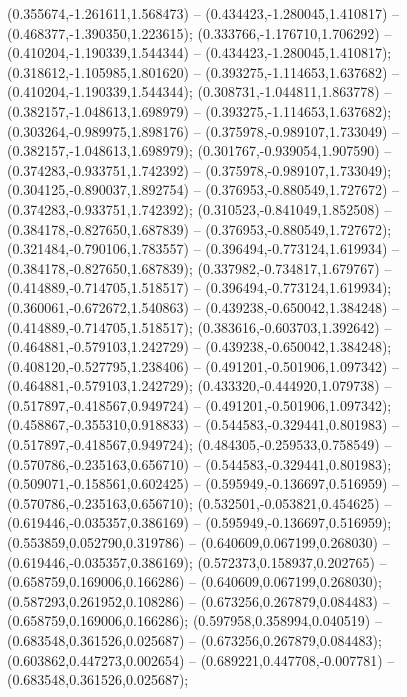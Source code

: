  (0.355674,-1.261611,1.568473) -- (0.434423,-1.280045,1.410817) -- (0.468377,-1.390350,1.223615);
 (0.333766,-1.176710,1.706292) -- (0.410204,-1.190339,1.544344) -- (0.434423,-1.280045,1.410817);
 (0.318612,-1.105985,1.801620) -- (0.393275,-1.114653,1.637682) -- (0.410204,-1.190339,1.544344);
 (0.308731,-1.044811,1.863778) -- (0.382157,-1.048613,1.698979) -- (0.393275,-1.114653,1.637682);
 (0.303264,-0.989975,1.898176) -- (0.375978,-0.989107,1.733049) -- (0.382157,-1.048613,1.698979);
 (0.301767,-0.939054,1.907590) -- (0.374283,-0.933751,1.742392) -- (0.375978,-0.989107,1.733049);
 (0.304125,-0.890037,1.892754) -- (0.376953,-0.880549,1.727672) -- (0.374283,-0.933751,1.742392);
 (0.310523,-0.841049,1.852508) -- (0.384178,-0.827650,1.687839) -- (0.376953,-0.880549,1.727672);
 (0.321484,-0.790106,1.783557) -- (0.396494,-0.773124,1.619934) -- (0.384178,-0.827650,1.687839);
 (0.337982,-0.734817,1.679767) -- (0.414889,-0.714705,1.518517) -- (0.396494,-0.773124,1.619934);
 (0.360061,-0.672672,1.540863) -- (0.439238,-0.650042,1.384248) -- (0.414889,-0.714705,1.518517);
 (0.383616,-0.603703,1.392642) -- (0.464881,-0.579103,1.242729) -- (0.439238,-0.650042,1.384248);
 (0.408120,-0.527795,1.238406) -- (0.491201,-0.501906,1.097342) -- (0.464881,-0.579103,1.242729);
 (0.433320,-0.444920,1.079738) -- (0.517897,-0.418567,0.949724) -- (0.491201,-0.501906,1.097342);
 (0.458867,-0.355310,0.918833) -- (0.544583,-0.329441,0.801983) -- (0.517897,-0.418567,0.949724);
 (0.484305,-0.259533,0.758549) -- (0.570786,-0.235163,0.656710) -- (0.544583,-0.329441,0.801983);
 (0.509071,-0.158561,0.602425) -- (0.595949,-0.136697,0.516959) -- (0.570786,-0.235163,0.656710);
 (0.532501,-0.053821,0.454625) -- (0.619446,-0.035357,0.386169) -- (0.595949,-0.136697,0.516959);
 (0.553859,0.052790,0.319786) -- (0.640609,0.067199,0.268030) -- (0.619446,-0.035357,0.386169);
 (0.572373,0.158937,0.202765) -- (0.658759,0.169006,0.166286) -- (0.640609,0.067199,0.268030);
 (0.587293,0.261952,0.108286) -- (0.673256,0.267879,0.084483) -- (0.658759,0.169006,0.166286);
 (0.597958,0.358994,0.040519) -- (0.683548,0.361526,0.025687) -- (0.673256,0.267879,0.084483);
 (0.603862,0.447273,0.002654) -- (0.689221,0.447708,-0.007781) -- (0.683548,0.361526,0.025687);
